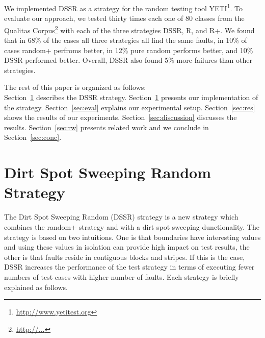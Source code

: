 \documentclass[conference]{IEEEtran}
\begin{document}
We implemented DSSR as a strategy for the random testing tool YETI\footnote{\url{http://www.yetitest.org}}. To evaluate our approach, we tested thirty times each one of 80 classes from the Qualitas Corpus\footnote{\url{http://...}} with each of the three strategies DSSR, R, and R+. We found that in 68\% of the cases all three strategies all find the same faults, in 10\% of cases random+ perfroms better, in 12\% pure random performs better, and 10\% DSSR performed better.
Overall, DSSR also found 5\% more failures than other strategies.

%
%
%
%
%
%
The rest of this paper is organized as follows: \\
Section~\ref{sec:dssr} describes the DSSR strategy. Section~\ref{sec:dssr} presents our implementation of the strategy. Section~\ref{sec:eval} explains our experimental setup. Section~\ref{sec:res} shows the results of our experiments. Section~\ref{sec:discussion} discusses the results. Section~\ref{sec:rw} presents related work and we conclude in Section~\ref{sec:conc}.




\section{Dirt Spot Sweeping Random Strategy}\label{sec:dssr}
The Dirt Spot Sweeping Random (DSSR) strategy is a new strategy which combines the random+ strategy and with a dirt spot sweeping dunctionality. The strategy is based on two intuitions. One is that boundaries have interesting values and using these values in isolation can provide high impact on test results, the other is that faults reside in contiguous blocks and stripes. If this is the case, DSSR increases the performance of the test strategy in terms of executing fewer numbers of test cases with higher number of faults. Each strategy is briefly explained as follows.
\end{document}
